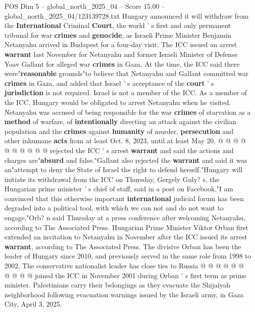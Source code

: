 \begin{textsample}{POS Dim 5 – global\_north\_2025\_04 – Score 15.00 – global\_north\_2025\_04/123139728.txt}  \label{ex:f5_pos_095}
Hungary announced it will withdraw from the \textbf{International} Criminal \textbf{Court}, the world ' s first and only permanent tribunal for war \textbf{crimes} and \textbf{genocide}, as Israeli Prime Minister Benjamin Netanyahu arrived in Budapest for a four-day visit.
The ICC issued an arrest \textbf{warrant} last November for Netanyahu and former Israeli Minister of Defense Yoav Gallant for alleged war \textbf{crimes} in Gaza.
At the time, the ICC said there were"\textbf{reasonable} grounds"to believe that Netanyahu and Gallant committed war \textbf{crimes} in Gaza, and added that Israel ' s acceptance of the \textbf{court} ' s \textbf{jurisdiction} is not required.
Israel is not a member of the ICC.
As a member of the ICC, Hungary would be obligated to arrest Netanyahu when he visited.
Netanyahu was accused of being responsible for the war \textbf{crimes} of starvation as a \textbf{method} of warfare, of \textbf{intentionally} directing an attack against the civilian population and the \textbf{crimes} against \textbf{humanity} of murder, \textbf{persecution} and other inhumane \textbf{acts} from at least Oct. 8, 2023, until at least May 20, @ @ @ @ @ @ @ @ @ @ rejected the ICC ' s arrest \textbf{warrant} and said the actions and charges are"\textbf{absurd} and false."Gallant also rejected the \textbf{warrant} and said it was an"attempt to deny the State of Israel the right to defend herself."Hungary will initiate its withdrawal from the ICC on Thursday, Gergely Guly? s, the Hungarian prime minister ' s chief of staff, said in a post on Facebook."I am convinced that this otherwise important \textbf{international} judicial forum has been degraded into a political tool, with which we can not and do not want to engage,"Orb? n said Thursday at a press conference after welcoming Netanyahu, according to The Associated Press.
Hungarian Prime Minister Viktor Orban first extended an invitation to Netanyahu in November after the ICC issued its arrest \textbf{warrant}, according to The Associated Press.
The divisive Orban has been the leader of Hungary since 2010, and previously served in the same role from 1998 to 2002.
The conservative nationalist leader has close ties to Russia @ @ @ @ @ @ @ @ @ @ joined the ICC in November 2001 during Orban ' s first term as prime minister.
Palestinians carry their belongings as they evacuate the Shijaiyah neighborhood following evacuation warnings issued by the Israeli army, in Gaza City, April 3, 2025.

\end{textsample}

